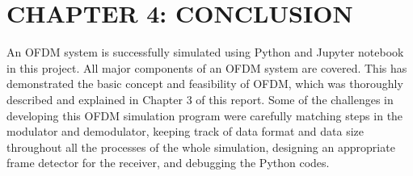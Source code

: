 \section*{CHAPTER 4: CONCLUSION}
\setcounter{section}{4}
\setcounter{subsection}{0}
\setcounter{figure}{0}
\setcounter{table}{0}

An OFDM system is successfully simulated using Python and Jupyter notebook in this project. All major components of an OFDM system are covered. This has demonstrated the basic concept and feasibility of OFDM, which was thoroughly described and explained in Chapter 3 of this report. Some of the challenges in developing this OFDM simulation program were carefully matching steps in the modulator and demodulator, keeping track of data format and data size throughout all the processes of the whole simulation, designing an appropriate frame detector for the receiver, and debugging the Python codes.

\newpage